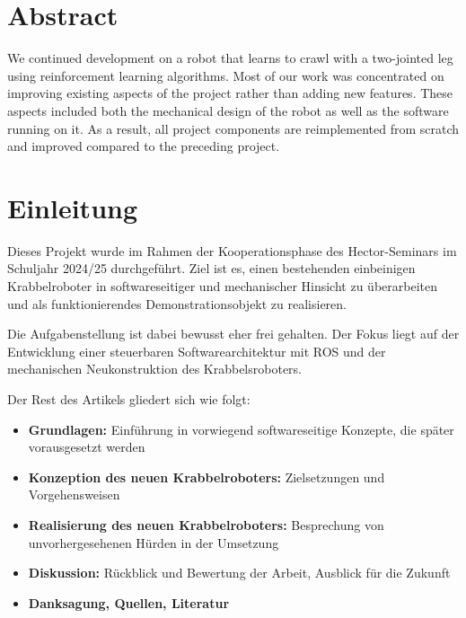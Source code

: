 \section*{Abstract}


We continued development on a robot that learns to crawl with a two-jointed leg using reinforcement learning algorithms. Most of our work was concentrated on improving existing aspects of the project rather than adding new features. These aspects included both the mechanical design of the robot as well as the software running on it. As a result, all project components are reimplemented from scratch and improved compared to the preceding project.

\section{Einleitung}

Dieses Projekt wurde im Rahmen der Kooperationsphase des Hector-Seminars im Schuljahr 2024/25 durchgeführt. 
Ziel ist es, einen bestehenden einbeinigen Krabbelroboter in softwareseitiger und mechanischer Hinsicht zu überarbeiten und als funktionierendes Demonstrationsobjekt zu realisieren.

Die Aufgabenstellung ist dabei bewusst eher frei gehalten. Der Fokus liegt auf der Entwicklung einer steuerbaren Softwarearchitektur mit ROS und der mechanischen Neukonstruktion des Krabbelsroboters.

Der Rest des Artikels gliedert sich wie folgt:

\begin{itemize}
	\item \textbf{Grundlagen:} Einführung in vorwiegend softwareseitige Konzepte, die später vorausgesetzt werden
	\item \textbf{Konzeption des neuen Krabbelroboters:} Zielsetzungen und Vorgehensweisen
	\item \textbf{Realisierung des neuen Krabbelroboters:} Besprechung von unvorhergesehenen Hürden in der Umsetzung
	\item \textbf{Diskussion:} Rückblick und Bewertung der Arbeit, Ausblick für die Zukunft
	\item \textbf{Danksagung, Quellen, Literatur}
\end{itemize}
